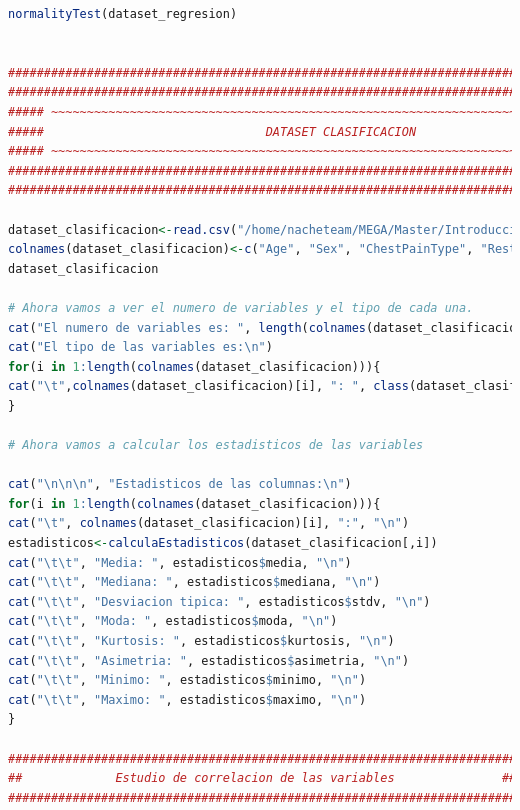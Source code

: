 \documentclass[12pt,a4paper]{article}
\begin{document}
\begin{lstlisting}[basicstyle=\tiny, language=R]
normalityTest(dataset_regresion)


###############################################################################################
###############################################################################################
##### ~~~~~~~~~~~~~~~~~~~~~~~~~~~~~~~~~~~~~~~~~~~~~~~~~~~~~~~~~~~~~~~~~~~~~~~~~~~~~~~~~~  #####
#####                               DATASET CLASIFICACION                                 #####
##### ~~~~~~~~~~~~~~~~~~~~~~~~~~~~~~~~~~~~~~~~~~~~~~~~~~~~~~~~~~~~~~~~~~~~~~~~~~~~~~~~~~  #####
###############################################################################################
###############################################################################################

dataset_clasificacion<-read.csv("/home/nacheteam/MEGA/Master/Introduccion a la ciencia de datos/Trabajo Integrador/DATOS/Datasets Clasificacion/heart/heart.dat", header=FALSE, comment.char = "@")
colnames(dataset_clasificacion)<-c("Age", "Sex", "ChestPainType", "RestBloodPressure", "SerumCholestoral", "FastingBloodSugar", "ResElectrocardiographic", "MaxHeartRate", "ExerciseInduced", "Oldpeak", "Slope", "MajorVessels", "Thal", "Class")
dataset_clasificacion

# Ahora vamos a ver el numero de variables y el tipo de cada una.
cat("El numero de variables es: ", length(colnames(dataset_clasificacion)), "\n")
cat("El tipo de las variables es:\n")
for(i in 1:length(colnames(dataset_clasificacion))){
cat("\t",colnames(dataset_clasificacion)[i], ": ", class(dataset_clasificacion[i][[1]]), "\n")
}

# Ahora vamos a calcular los estadisticos de las variables

cat("\n\n\n", "Estadisticos de las columnas:\n")
for(i in 1:length(colnames(dataset_clasificacion))){
cat("\t", colnames(dataset_clasificacion)[i], ":", "\n")
estadisticos<-calculaEstadisticos(dataset_clasificacion[,i])
cat("\t\t", "Media: ", estadisticos$media, "\n")
cat("\t\t", "Mediana: ", estadisticos$mediana, "\n")
cat("\t\t", "Desviacion tipica: ", estadisticos$stdv, "\n")
cat("\t\t", "Moda: ", estadisticos$moda, "\n")
cat("\t\t", "Kurtosis: ", estadisticos$kurtosis, "\n")
cat("\t\t", "Asimetria: ", estadisticos$asimetria, "\n")
cat("\t\t", "Minimo: ", estadisticos$minimo, "\n")
cat("\t\t", "Maximo: ", estadisticos$maximo, "\n")
}

#######################################################################
##             Estudio de correlacion de las variables               ##
#######################################################################


\end{lstlisting}
\end{document}
